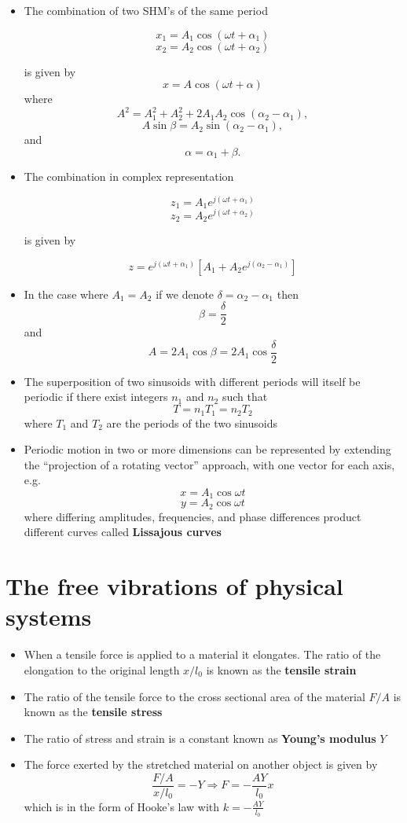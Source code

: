 \documentclass{article}
\begin{document}
\begin{itemize}
  \item The combination of two SHM's of the same period

        \[x_1 = A_1 \cos (\omega t + \alpha_1)\]
        \[x_2 = A_2 \cos (\omega t + \alpha_2)\]

        is given by \[x = A \cos (\omega t + \alpha)\] where \[A^2 = A_1^2 + A_2^2 + 2 A_1 A_2 \cos (\alpha_2 - \alpha_1),\] \[A \sin \beta = A_2 \sin (\alpha_2 - \alpha_1),\] and \[\alpha = \alpha_1 + \beta.\]

  \item The combination in complex representation

        \[z_1 = A_1 e^{j (\omega t + \alpha_1)}\]
        \[z_2 = A_2 e^{j (\omega t + \alpha_2)}\]

        is given by

        \[z = e^{j (\omega t + \alpha_1)} [A_1 + A_2 e^{j (\alpha_2 - \alpha_1)}]\]

  \item In the case where $A_1 = A_2$ if we denote $\delta = \alpha_2 - \alpha_1$ then \[\beta = \frac{\delta}{2}\] and \[A = 2 A_1 \cos \beta = 2 A_1 \cos \frac{\delta}{2}\]

  \item The superposition of two sinusoids with different periods will itself be periodic if there exist integers $n_1$ and $n_2$ such that \[T = n_1 T_1 = n_2 T_2\] where $T_1$ and $T_2$ are the periods of the two sinusoids

  \item Periodic motion in two or more dimensions can be represented by extending the ``projection of a rotating vector'' approach, with one vector for each axis, e.g. \[x = A_1 \cos \omega t\] \[y = A_2 \cos \omega t\] where differing amplitudes, frequencies, and phase differences product different curves called \textbf{Lissajous curves}
\end{itemize}

\section{The free vibrations of physical systems}

\begin{itemize}
  \item When a tensile force is applied to a material it elongates. The ratio of the elongation to the original length $x / l_0$ is known as the \textbf{tensile strain}

  \item The ratio of the tensile force to the cross sectional area of the material $F / A$ is known as the \textbf{tensile stress}

  \item The ratio of stress and strain is a constant known as \textbf{Young's modulus} $Y$

  \item The force exerted by the stretched material on another object is given by \[\frac{F / A}{x / l_0} = -Y \Rightarrow F = -\frac{A Y}{l_0} x\] which is in the form of Hooke's law with $k = -\frac{A Y}{l_0}$
\end{itemize}
\end{document}
